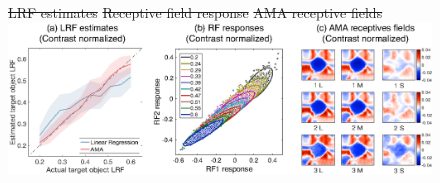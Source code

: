 \documentclass{jov}
\providecommand{\DIFdeltex}[1]{{\protect\color{red}\sout{#1}}}                      %
\providecommand{\DIFdelFL}[1]{\DIFdel{#1}} %
\providecommand{\DIFaddbeginFL}{} %
\providecommand{\DIFdelbeginFL}{} %
\providecommand{\DIFdelendFL}{} %
\providecommand{\DIFdel}[1]{\texorpdfstring{\DIFdeltex{#1}}{}} %
\newcommand{\DIFscaledelfig}{0.5}
\newlength{\DIFdelgraphicswidth} %
\newlength{\DIFdelgraphicsheight} %
\newcommand{\DIFaddincludegraphics}[2][]{{\color{blue}\fbox{\DIFOincludegraphics[#1]{#2}}}} %
\newcommand{\DIFdelincludegraphics}[2][]{%
\sbox{\DIFdelgraphicsbox}{\DIFOincludegraphics[#1]{#2}}%
\settoboxwidth{\DIFdelgraphicswidth}{\DIFdelgraphicsbox} %
\settoboxtotalheight{\DIFdelgraphicsheight}{\DIFdelgraphicsbox} %
\scalebox{\DIFscaledelfig}{%
\parbox[b]{\DIFdelgraphicswidth}{\usebox{\DIFdelgraphicsbox}\\[-\baselineskip] \rule{\DIFdelgraphicswidth}{0em}}\llap{\resizebox{\DIFdelgraphicswidth}{\DIFdelgraphicsheight}{%
\setlength{\unitlength}{\DIFdelgraphicswidth}%
\begin{picture}(1,1)%
\thicklines\linethickness{2pt} %
{\color[rgb]{1,0,0}\put(0,0){\framebox(1,1){}}}%
{\color[rgb]{1,0,0}\put(0,0){\line( 1,1){1}}}%
{\color[rgb]{1,0,0}\put(0,1){\line(1,-1){1}}}%
\end{picture}%
}\hspace*{3pt}}} %
} %
\DeclareRobustCommand{\DIFaddbeginFL}{\DIFOaddbeginFL \let\includegraphics\DIFaddincludegraphics} %
\DeclareRobustCommand{\DIFdelbeginFL}{\DIFOdelbeginFL \let\includegraphics\DIFdelincludegraphics} %
\DeclareRobustCommand{\DIFdelendFL}{\DIFOaddendFL \let\includegraphics\DIFOincludegraphics} %
\begin{document}
\begin{figure}
\centering
\DIFdelbeginFL %
{%
\DIFdelFL{LRF estimates}}
{%
\DIFdelFL{Receptive field response}}
{%
\DIFdelFL{AMA receptive fields}}
\DIFdelendFL %
\DIFaddbeginFL \includegraphics{Figure12.eps}

\end{figure}
\end{document}
